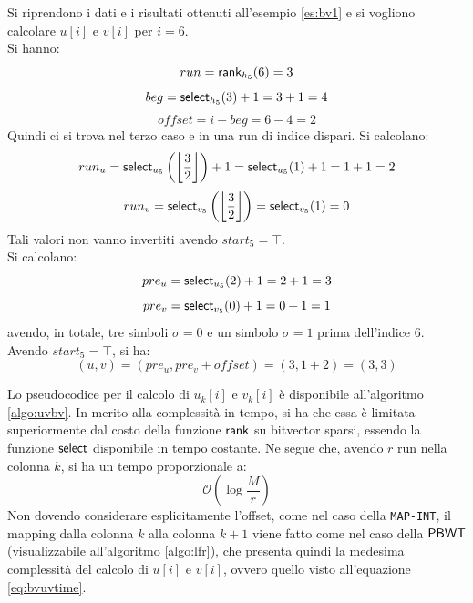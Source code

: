 \begin{esempio}
  Si riprendono i dati e i risultati ottenuti all'esempio \ref{es:bv1} e si
  vogliono calcolare $u[i]$ e $v[i]$ per $i=6$.\\
  Si hanno:
  \[run=\mbox{\rm {\sf rank}}_{h_5}(6)=3\]
  \[beg = \mbox{\rm {\sf select}}_{h_5}(3)+1=3+1=4\]
  \[offset = i-beg=6-4=2\]
  Quindi ci si trova nel terzo caso e in una run di
  indice dispari. Si calcolano:
  \[run_u=\mbox{\rm {\sf select}}_{u_5}\left(\left\lfloor\frac{3}{2}\right\rfloor\right)+1=
    \mbox{\rm {\sf select}}_{u_5}(1)+1 =1+1=2\] 
  \[run_v=\mbox{\rm {\sf select}}_{v_5}\left(\left\lfloor\frac{3}{2}\right\rfloor\right)=
    \mbox{\rm {\sf select}}_{v_5}(1)=0\] 
  Tali valori non vanno invertiti avendo $start_5=\top$.\\
  Si calcolano:
  \[pre_u=\mbox{\rm {\sf select}}_{u_5}(2)+1=2+1=3\]
  \[pre_v=\mbox{\rm {\sf select}}_{v_5}(0)+1=0+1=1\]
  avendo, in totale, tre simboli $\sigma=0$ e un simbolo $\sigma=1$
  prima dell'indice 6.\\ 
  Avendo $start_5=\top$, si ha:
  \[(u,v)=(pre_u, pre_v + offset)=(3,1+2)=(3,3)\]
\end{esempio}
Lo pseudocodice per il calcolo di $u_k[i]$ e $v_k[i]$ è disponibile
all'algoritmo \ref{algo:uvbv}. In merito alla 
complessità in tempo, si ha che essa è
limitata superiormente dal costo della funzione $\mbox{\rm {\sf rank}}$ su
bitvector sparsi, essendo la funzione $\mbox{\rm {\sf select}}$ disponibile in
tempo costante. Ne segue che, avendo $r$ run nella colonna $k$, si ha un tempo
proporzionale a:
\begin{equation}
  \label{eq:bvuvtime}
  \mathcal{O}\left(\log\frac{M}{r}\right)
\end{equation}
Non dovendo considerare esplicitamente l'offset, come nel caso della
\texttt{MAP-INT}, 
il mapping dalla colonna $k$ alla 
colonna $k+1$ viene fatto come nel caso della
$\mbox{\rm {\sf PBWT}}$ (visualizzabile all'algoritmo \ref{algo:lfr}), che presenta
quindi la medesima complessità del calcolo di $u[i]$ e $v[i]$, ovvero quello
visto all'equazione \ref{eq:bvuvtime}.
